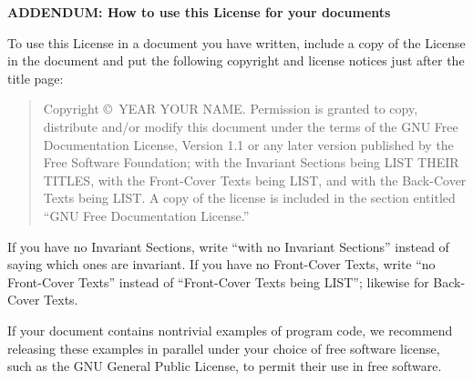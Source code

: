 \documentclass{doc}
\begin{document}
\noindent\textbf{ADDENDUM: How to use this License for your documents}

To use this License in a document you have written, include a copy of
the License in the document and put the following copyright and
license notices just after the title page:

\begin{quote}

      Copyright \copyright\ YEAR  YOUR NAME.
      Permission is granted to copy, distribute and/or modify this document
      under the terms of the GNU Free Documentation License, Version 1.1
      or any later version published by the Free Software Foundation;
      with the Invariant Sections being LIST THEIR TITLES, with the
      Front-Cover Texts being LIST, and with the Back-Cover Texts being LIST.
      A copy of the license is included in the section entitled ``GNU
      Free Documentation License.''

\end{quote}

If you have no Invariant Sections, write ``with no Invariant Sections''
instead of saying which ones are invariant.  If you have no
Front-Cover Texts, write ``no Front-Cover Texts'' instead of
``Front-Cover Texts being LIST''; likewise for Back-Cover Texts.

If your document contains nontrivial examples of program code, we
recommend releasing these examples in parallel under your choice of
free software license, such as the GNU General Public License,
to permit their use in free software.
\end{document}
